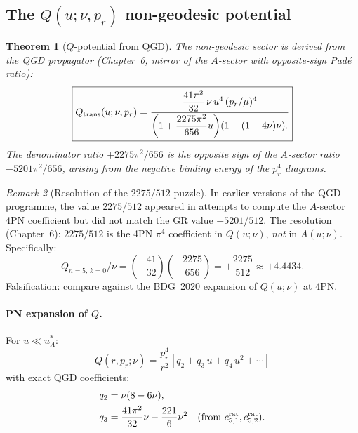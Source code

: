 \documentclass[11pt,a4paper]{article}
\theoremstyle{plain}
\newtheorem{theorem}{Theorem}[section]
\theoremstyle{definition}
\theoremstyle{remark}
\newtheorem{remark}[theorem]{Remark}
\newcommand{\uA}{u_A^*}
\begin{document}
\subsection{The $Q(u;\nu,p_r)$ non-geodesic potential}

\begin{theorem}[$Q$-potential from QGD]\label{thm:Q}
The non-geodesic sector is derived from the QGD propagator (Chapter~6,
mirror of the $A$-sector with opposite-sign Pad\'e ratio):
\begin{equation}
  \boxed{Q_{\rm trans}(u;\nu,p_r)
  = \frac{\dfrac{41\pi^2}{32}\,\nu\,u^4\,(p_r/\mu)^4}
    {\displaystyle\left(1+\frac{2275\pi^2}{656}u\right)\!
    (1-(1-4\nu)\nu).}}
  \label{eq:Q_trans}
\end{equation}
The denominator ratio $+2275\pi^2/656$ is the \emph{opposite sign} of the
$A$-sector ratio $-5201\pi^2/656$, arising from the negative binding energy
of the $p_r^4$ diagrams.
\end{theorem}

\begin{remark}[Resolution of the $2275/512$ puzzle]
In earlier versions of the QGD programme, the value $2275/512$ appeared in
attempts to compute the $A$-sector 4PN coefficient but did not match the GR
value $-5201/512$.  The resolution (Chapter~6): $2275/512$ is the 4PN $\pi^4$
coefficient in $Q(u;\nu)$, \emph{not} in $A(u;\nu)$.  Specifically:
\begin{equation}
  Q_{n=5,\,k=0}/\nu = \left(-\frac{41}{32}\right)\!\left(-\frac{2275}{656}\right)
  = +\frac{2275}{512}\approx+4.4434.
\end{equation}
Falsification: compare against the BDG~2020 expansion of $Q(u;\nu)$ at 4PN.
\end{remark}

\paragraph{PN expansion of $Q$.}
For $u\ll\uA$:
\begin{equation}
  Q(r,p_r;\nu) = \frac{p_r^4}{r^2}
    \!\left[q_2 + q_3\,u + q_4\,u^2 + \cdots\right]
  \label{eq:Q_PN}
\end{equation}
with exact QGD coefficients:
\begin{align}
  q_2 &= \nu(8-6\nu), \label{eq:q2}\\
  q_3 &= \frac{41\pi^2}{32}\nu - \frac{221}{6}\nu^2
    \quad\text{(from }c_{5,1}^{\rm rat},c_{5,2}^{\rm rat}\text{)}.
  \label{eq:q3}
\end{align}
\end{document}
